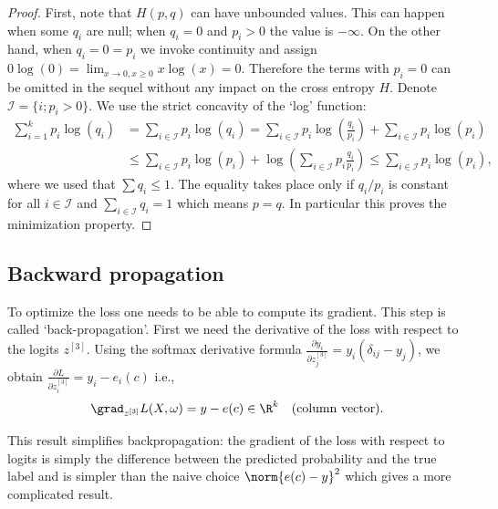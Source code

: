 \begin{proof}
First, note that $H(p, q)$ can have unbounded values. This can happen when some $q_i$ are null; when $q_i = 0$ and $p_i > 0$ the value is $-\infty$. On the other hand, when $q_i = 0 = p_i$ we invoke continuity and assign $0 \log(0) = \lim_{x \to 0, x \geq 0} x \log(x) = 0$. Therefore the terms with $p_i = 0$ can be omitted in the sequel without any impact on the cross entropy $H$. Denote $\mathcal{I} = \{i; p_i > 0\}$. We use the strict concavity of the `log' function:
\begin{equation}\label{eq:ch7-KL-proof}
  \begin{aligned}
    \sum_{i=1}^{k} p_i \log(q_i) &= \sum_{i \in \mathcal{I}} p_i \log(q_i) = \sum_{i \in \mathcal{I}} p_i \log\!\left( \frac{q_i}{p_i} \right) + \sum_{i \in \mathcal{I}} p_i \log(p_i) \\
    &\leq \sum_{i \in \mathcal{I}} p_i \log(p_i) + \log\!\left( \sum_{i \in \mathcal{I}} p_i \frac{q_i}{p_i} \right) \leq \sum_{i \in \mathcal{I}} p_i \log(p_i),
  \end{aligned}
\end{equation}
where we used that $\sum q_i \leq 1$. The equality takes place only if $q_i / p_i$ is constant for all $i \in \mathcal{I}$ and $\sum_{i \in \mathcal{I}} q_i = 1$ which means $p = q$. In particular this proves the minimization property.
\end{proof}

\subsection{Backward propagation}\label{sec:ch7-backprop}

To optimize the loss one needs to be able to compute its gradient. This step is called `back-propagation'. First we need the derivative of the loss with respect to the logits $z^{[3]}$. Using the softmax derivative formula $\frac{\partial y_i}{\partial z^{[3]}_j} = y_i (\delta_{ij} - y_j)$, we obtain $\frac{\partial L}{\partial z^{[3]}_i} = y_i - e_i(c)$ i.e.,
\begin{equation}\label{eq:ch7-grad-logits}
  \grad_{z^{[3]}} L(X, \omega) = y - e(c) \in \R^k \quad \text{(column vector)}.
\end{equation}

This result simplifies backpropagation: the gradient of the loss with respect to logits is simply the difference between the predicted probability and the true label and is simpler than the naive choice $\norm{e(c) - y}^2$ which gives a more complicated result.

